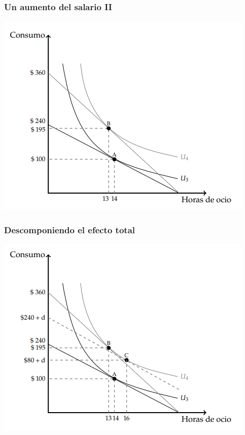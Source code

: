 \documentclass{beamer}
\begin{document}
\begin{frame}
  \frametitle{Un aumento del salario II}
  \begin{center}
    \includegraphics[scale=0.9]{../Figures/C9.9.png}
  \end{center}
\end{frame}

\begin{frame}
  \frametitle{Descomponiendo el efecto total}
  \begin{center}
    \includegraphics[scale=0.9]{../Figures/C9.10.png}
  \end{center}
\end{frame}
\end{document}
